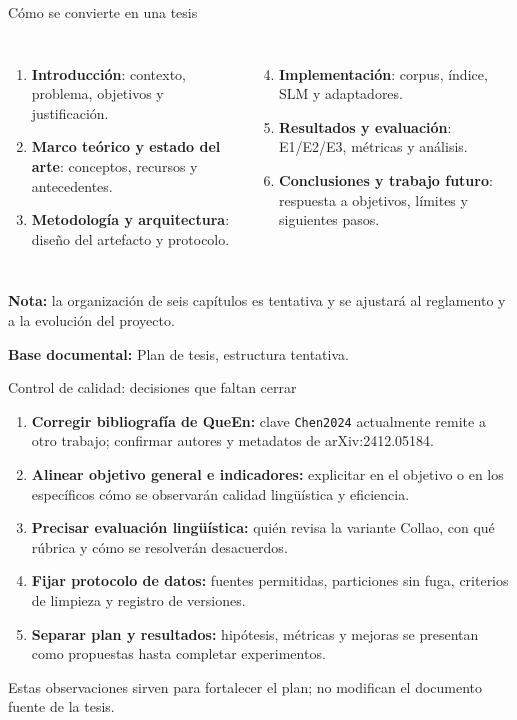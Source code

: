 \documentclass[aspectratio=169,10pt,spanish]{beamer}
\newcommand{\fuente}[1]{\vfill{\tiny\color{bpNavy!75}\textbf{Base documental:} #1}}
\begin{document}
\begin{frame}{Cómo se convierte en una tesis}
\small
\begin{columns}[T,onlytextwidth]
\begin{enumerate}
\item \textbf{Introducción}: contexto, problema, objetivos y justificación.
\item \textbf{Marco teórico y estado del arte}: conceptos, recursos y antecedentes.
\item \textbf{Metodología y arquitectura}: diseño del artefacto y protocolo.
\end{enumerate}
\begin{enumerate}\setcounter{enumi}{3}
\item \textbf{Implementación}: corpus, índice, SLM y adaptadores.
\item \textbf{Resultados y evaluación}: E1/E2/E3, métricas y análisis.
\item \textbf{Conclusiones y trabajo futuro}: respuesta a objetivos, límites y siguientes pasos.
\end{enumerate}
\end{columns}
\vspace{0.3cm}
\begin{tcolorbox}[colback=bpLightGray,colframe=bpGold]
\centering\small\textbf{Nota:} la organización de seis capítulos es tentativa y se ajustará al reglamento y a la evolución del proyecto.
\end{tcolorbox}
\fuente{Plan de tesis, estructura tentativa.}
\end{frame}

\begin{frame}{Control de calidad: decisiones que faltan cerrar}
\small
\begin{enumerate}
\item \textbf{Corregir bibliografía de QueEn:} clave \texttt{Chen2024} actualmente remite a otro trabajo; confirmar autores y metadatos de arXiv:2412.05184.
\item \textbf{Alinear objetivo general e indicadores:} explicitar en el objetivo o en los específicos cómo se observarán calidad lingüística y eficiencia.
\item \textbf{Precisar evaluación lingüística:} quién revisa la variante Collao, con qué rúbrica y cómo se resolverán desacuerdos.
\item \textbf{Fijar protocolo de datos:} fuentes permitidas, particiones sin fuga, criterios de limpieza y registro de versiones.
\item \textbf{Separar plan y resultados:} hipótesis, métricas y mejoras se presentan como propuestas hasta completar experimentos.
\end{enumerate}
\vspace{0.15cm}
\begin{tcolorbox}[colback=bpLightGray,colframe=bpRust]
\centering\small Estas observaciones sirven para fortalecer el plan; no modifican el documento fuente de la tesis.
\end{tcolorbox}
\end{frame}
\end{document}
